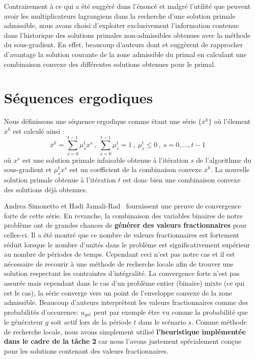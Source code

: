 \vspace*{1.2cm}

Contrairement à ce qui a été suggéré dans l'énoncé et malgré l'utilité que peuvent avoir les multiplicateurs lagrangiens
dans la recherche d'une solution primale admissible, nous avons choisi d'exploiter exclusivement l'information
contenue dans l'historique des solutions primales non-admissibles obtenues avec la méthode du sous-gradient.
En effet, beaucoup d'auteurs dont \citep{doi:10.1137/S1052623498332336} et \citep{Zhuang1988}
suggèrent de rapprocher d'avantage la solution courante de la zone admissible du primal en calculant une combinaison
convexe des différentes solutions obtenues pour le primal.

\section{Séquences ergodiques}

Nous définissons une séquence ergodique comme étant une série $\{\overline{x}^k\}$ où l'élement $\overline{x}^k$
est calculé ainsi \citep{Aldenvik}:
\begin{equation}
    \overline{x}^k = \sum\limits_{s=0}^{t-1} \mu_s^t x^s \ , \ \sum\limits_{s=0}^{t-1} \mu_s^t = 1 \ , \ \mu_s^t \le 0 \ , \ s = 0, \ldots, t-1
\end{equation}
où $x^s$ est une solution primale infaisable obtenue à l'itération $s$ de l'algorithme du sous-gradient et $\mu_s^t x^s$ est un coefficient
de la combinaison convexe $\overline{x}^k$. La nouvelle solution primale obtenue à l'itération $t$ est donc bien une combinaison convexe 
des solutions déjà obtenues.

Andrea Simonetto et Hadi Jamali-Rad~\citep{Simonetto2016} fournissent une preuve de convergence forte de cette série.
En revanche, la combinaison des variables binaires de notre problème ont de grandes chances de \textbf{générer des valeurs fractionnaires} pour
celles-ci. Il a été montré que ce nombre de valeurs fractionnaires est fortement réduit lorsque le nombre d'unités dans le problème
est significativement supérieur au nombre de périodes de temps. Cependant ceci n'est pas notre cas et il est nécessaire de recourir à une 
méthode de recherche locale afin de trouver une solution respectant les contraintes d'intégralité.
La convergence forte n'est pas assurée mais cependant dans le cas d'un problème entier (binaire) mixte (ce qui est le cas), la série converge vers 
un point de l'enveloppe convexe de la zone admissible. Beaucoup d'auteurs interprètent les valeurs fractionnaires comme des probabilités
d'occurence: $u_{gst}$ peut par exemple être vu comme la probabilité que le générateur $g$ soit actif lors de la période $t$ dans le scénario $s$.
Comme méthode de recherche locale, nous avons simplement utilisé \textbf{l'heuristique implémentée dans le cadre de la tâche 2} car nous l'avons
justement spécialement conçue pour les solutions contenant des valeurs fractionnaires.

